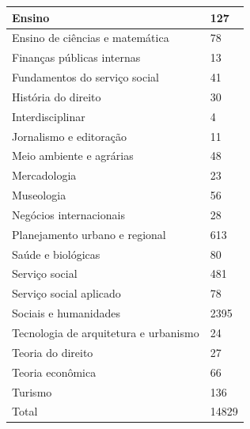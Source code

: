 \documentclass[
   article,       %
   11pt,          %
   oneside,       %
   a4paper,       %
   english,       %
   brazil,           %
   sumario=tradicional
   ]{abntex2}
\begin{document}
\begin{table}[htb]
\begin{tabular}{p{8.0cm}|p{4.0cm}}
   \hline
   Ensino  &  127 \\
   \hline
   Ensino de ciências e matemática  &  78 \\
   \hline
   Finanças públicas internas  &  13 \\
   \hline
   Fundamentos do serviço social  &  41 \\
   \hline
   História do direito  &  30 \\
   \hline
   Interdisciplinar  &  4 \\
   \hline
   Jornalismo e editoração  &  11 \\
   \hline
   Meio ambiente e agrárias  &  48 \\
   \hline
   Mercadologia  &  23 \\
   \hline
   Museologia  &  56 \\
   \hline
   Negócios internacionais  &  28 \\
   \hline
   Planejamento urbano e regional  &  613 \\
   \hline
   Saúde e biológicas  &  80 \\
   \hline
   Serviço social  &  481 \\
   \hline
   Serviço social aplicado  &  78 \\
   \hline
   Sociais e humanidades  &  2395 \\
   \hline
   Tecnologia de arquitetura e urbanismo  &  24 \\
   \hline
   Teoria do direito  &  27 \\
   \hline
   Teoria econômica  &  66 \\
   \hline
   Turismo  &  136 \\
   \hline
   \hline
   Total  &  14829 \\

\end{tabular}
\end{table}
\end{document}

